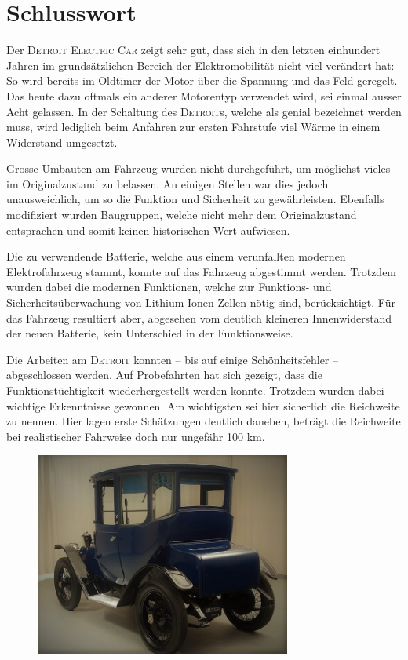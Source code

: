\chapter{Schlusswort}
\color{blue}
Der \textsc{Detroit Electric Car} zeigt sehr gut, dass sich in den letzten einhundert Jahren im grundsätzlichen Bereich der Elektromobilität nicht viel verändert hat: So wird bereits im Oldtimer der Motor über die Spannung und das Feld geregelt. Das heute dazu oftmals ein anderer Motorentyp verwendet wird, sei einmal ausser Acht gelassen. In der Schaltung des \textsc{Detroit}s, welche als genial bezeichnet werden muss, wird lediglich beim Anfahren zur ersten Fahrstufe viel Wärme in einem Widerstand umgesetzt.

Grosse Umbauten am Fahrzeug wurden nicht durchgeführt, um möglichst vieles im Originalzustand zu belassen. An einigen Stellen war dies jedoch unausweichlich, um so die Funktion und Sicherheit zu gewährleisten. Ebenfalls modifiziert wurden Baugruppen, welche nicht mehr dem Originalzustand entsprachen und somit keinen historischen Wert aufwiesen.

Die zu verwendende Batterie, welche aus einem verunfallten modernen Elektrofahrzeug stammt, konnte auf das Fahrzeug abgestimmt werden. Trotzdem wurden dabei die modernen Funktionen, welche zur Funktions- und Sicherheitsüberwachung von Lithium-Ionen-Zellen nötig sind, berücksichtigt. Für das Fahrzeug resultiert aber, abgesehen vom deutlich kleineren Innenwiderstand der neuen Batterie, kein Unterschied in der Funktionsweise.

Die Arbeiten am \textsc{Detroit} konnten -- bis auf einige Schönheitsfehler -- abgeschlossen werden. Auf Probefahrten hat sich gezeigt, dass die Funktionstüchtigkeit wiederhergestellt werden konnte. Trotzdem wurden dabei wichtige Erkenntnisse gewonnen. Am wichtigsten sei hier sicherlich die Reichweite zu nennen. Hier lagen erste Schätzungen deutlich daneben, beträgt die Reichweite bei realistischer Fahrweise doch nur ungefähr 100 km.

\begin{figure}[h]
	\centering
		\includegraphics[width=0.75\textwidth]{images/Ende.jpg}
	\label{fig:Ende}
\end{figure}


\color{black}